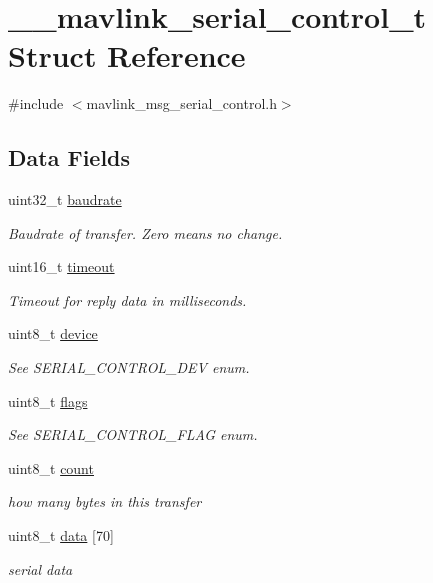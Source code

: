 \hypertarget{struct____mavlink__serial__control__t}{\section{\+\_\+\+\_\+mavlink\+\_\+serial\+\_\+control\+\_\+t Struct Reference}
\label{struct____mavlink__serial__control__t}
}


{\ttfamily \#include $<$mavlink\+\_\+msg\+\_\+serial\+\_\+control.\+h$>$}

\subsection*{Data Fields}
\begin{DoxyCompactItemize}
\item 
uint32\+\_\+t \hyperlink{struct____mavlink__serial__control__t_a7daa8940caf4f90197d312dcc3714786}{baudrate}
\begin{DoxyCompactList}\small\item\em Baudrate of transfer. Zero means no change. \end{DoxyCompactList}\item 
uint16\+\_\+t \hyperlink{struct____mavlink__serial__control__t_af55fbe28104f724964546c2a71086a54}{timeout}
\begin{DoxyCompactList}\small\item\em Timeout for reply data in milliseconds. \end{DoxyCompactList}\item 
uint8\+\_\+t \hyperlink{struct____mavlink__serial__control__t_a2326bf29dd4cf72192fa2deeeb64d806}{device}
\begin{DoxyCompactList}\small\item\em See S\+E\+R\+I\+A\+L\+\_\+\+C\+O\+N\+T\+R\+O\+L\+\_\+\+D\+E\+V enum. \end{DoxyCompactList}\item 
uint8\+\_\+t \hyperlink{struct____mavlink__serial__control__t_a73536aa8d96ff6146fb62869d3d25e0f}{flags}
\begin{DoxyCompactList}\small\item\em See S\+E\+R\+I\+A\+L\+\_\+\+C\+O\+N\+T\+R\+O\+L\+\_\+\+F\+L\+A\+G enum. \end{DoxyCompactList}\item 
uint8\+\_\+t \hyperlink{struct____mavlink__serial__control__t_acf50603676367ad8b697cf49f7b7a02b}{count}
\begin{DoxyCompactList}\small\item\em how many bytes in this transfer \end{DoxyCompactList}\item 
uint8\+\_\+t \hyperlink{struct____mavlink__serial__control__t_a44023fc3066b5851820a1a69681e5615}{data} \mbox{[}70\mbox{]}
\begin{DoxyCompactList}\small\item\em serial data \end{DoxyCompactList}\end{DoxyCompactItemize}


